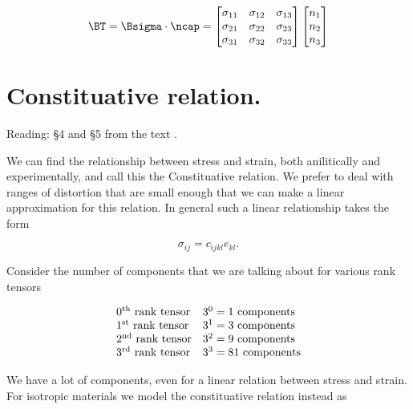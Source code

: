 \begin{equation}\label{eqn:continuumL5:50}
\BT = \Bsigma \cdot \ncap
=
\begin{bmatrix}
\sigma_{11} & \sigma_{12} & \sigma_{13} \\
\sigma_{21} & \sigma_{22} & \sigma_{23} \\
\sigma_{31} & \sigma_{32} & \sigma_{33}
\end{bmatrix}
\begin{bmatrix}
n_1 \\
n_2 \\
n_3
\end{bmatrix}
\end{equation}

\section{Constituative relation.}

Reading: \S 4 and \S 5 from the text \cite{landau1960theory}.

We can find the relationship between stress and strain, both anilitically and experimentally, and call this the Constituative relation.  We prefer to deal with ranges of distortion that are small enough that we can make a linear approximation for this relation.  In general such a linear relationship takes the form

\begin{equation}\label{eqn:continuumL5:70}
\sigma_{ij} = c_{ijkl} e_{kl}.
\end{equation}

Consider the number of components that we are talking about for various rank tensors

\begin{equation}\label{eqn:continuumL5:90}
\begin{array}{l l}
\mbox{$0^\text{th}$ rank tensor} & \mbox{$3^0 = 1$ components} \\
\mbox{$1^\text{st}$ rank tensor} & \mbox{$3^1 = 3$ components} \\
\mbox{$2^\text{nd}$ rank tensor} & \mbox{$3^2 = 9$ components} \\
\mbox{$3^\text{rd}$ rank tensor} & \mbox{$3^3 = 81$ components}
\end{array}
\end{equation}

We have a lot of components, even for a linear relation between stress and strain.  For isotropic materials we model the constituative relation instead as

